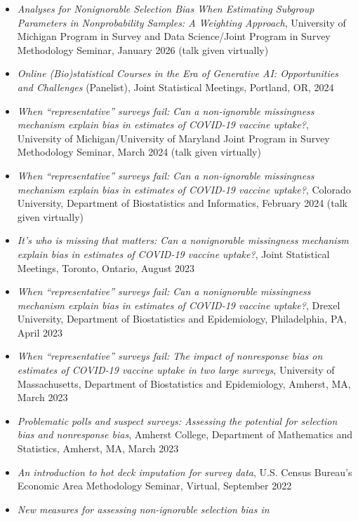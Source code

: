 \documentclass[
  english,
  letterpaper,
  DIV=11,
  numbers=noendperiod]{scrartcl}
\providecommand{\tightlist}{%
  \setlength{\itemsep}{0pt}\setlength{\parskip}{0pt}}
\begin{document}
\begin{itemize}
\tightlist
\item
  \emph{Analyses for Nonignorable Selection Bias When Estimating
  Subgroup Parameters in Nonprobability Samples: A Weighting Approach},
  University of Michigan Program in Survey and Data Science/Joint
  Program in Survey Methodology Seminar, January 2026 (talk given
  virtually)
\item
  \emph{Online (Bio)statistical Courses in the Era of Generative AI:
  Opportunities and Challenges} (Panelist), Joint Statistical Meetings,
  Portland, OR, 2024
\item
  \emph{When ``representative'' surveys fail: Can a non-ignorable
  missingness mechanism explain bias in estimates of COVID-19 vaccine
  uptake?}, University of Michigan/University of Maryland Joint Program
  in Survey Methodology Seminar, March 2024 (talk given virtually)
\item
  \emph{When ``representative'' surveys fail: Can a non-ignorable
  missingness mechanism explain bias in estimates of COVID-19 vaccine
  uptake?}, Colorado University, Department of Biostatistics and
  Informatics, February 2024 (talk given virtually)
\item
  \emph{It's who is missing that matters: Can a nonignorable missingness
  mechanism explain bias in estimates of COVID-19 vaccine uptake?},
  Joint Statistical Meetings, Toronto, Ontario, August 2023
\item
  \emph{When ``representative'' surveys fail: Can a nonignorable
  missingness mechanism explain bias in estimates of COVID-19 vaccine
  uptake?}, Drexel University, Department of Biostatistics and
  Epidemiology, Philadelphia, PA, April 2023
\item
  \emph{When ``representative'' surveys fail: The impact of nonresponse
  bias on estimates of COVID-19 vaccine uptake in two large surveys},
  University of Massachusetts, Department of Biostatistics and
  Epidemiology, Amherst, MA, March 2023
\item
  \emph{Problematic polls and suspect surveys: Assessing the potential
  for selection bias and nonresponse bias}, Amherst College, Department
  of Mathematics and Statistics, Amherst, MA, March 2023
\item
  \emph{An introduction to hot deck imputation for survey data}, U.S.
  Census Bureau's Economic Area Methodology Seminar, Virtual, September
  2022
\item
  \emph{New measures for assessing non-ignorable selection bias in
}
\end{itemize}
\end{document}
